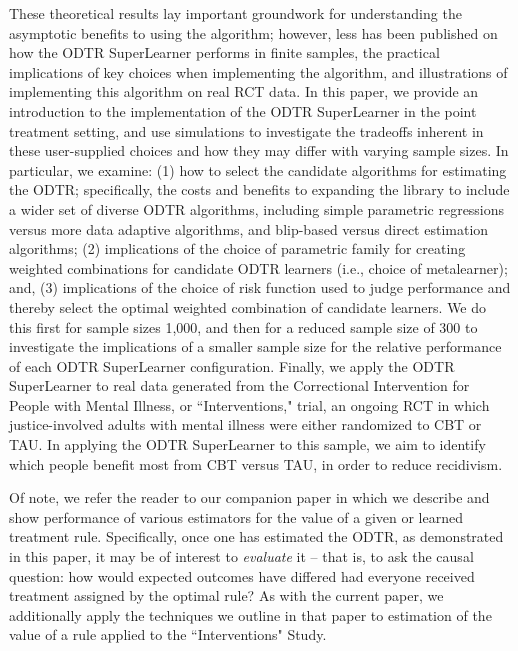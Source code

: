 \documentclass[a4paper,12pt]{article}
\begin{document}
These theoretical results lay important groundwork for understanding the asymptotic benefits to using the algorithm; however, less has been published on how the ODTR SuperLearner performs in finite samples, the practical implications of key choices when implementing the algorithm, and illustrations of implementing this algorithm on real RCT data. In this paper, we provide an introduction to the implementation of the ODTR SuperLearner in the point treatment setting, and use simulations to investigate the tradeoffs inherent in these user-supplied choices and how they may differ with varying sample sizes. In particular, we examine: (1) how to select the candidate algorithms for estimating the ODTR; specifically, the costs and benefits to expanding the library to include a wider set of diverse ODTR algorithms, including simple parametric regressions versus more data adaptive algorithms, and blip-based versus direct estimation algorithms; (2) implications of the choice of parametric family for creating weighted combinations for candidate ODTR learners (i.e., choice of metalearner); and, (3) implications of the choice of risk function used to judge performance and thereby select the optimal weighted combination of candidate learners. We do this first for sample sizes 1,000, and then for a reduced sample size of 300 to investigate the implications of a smaller sample size for the relative performance of each ODTR SuperLearner configuration. Finally, we apply the ODTR SuperLearner to real data generated from the Correctional Intervention for People with Mental Illness, or ``Interventions," trial, an ongoing RCT in which justice-involved adults with mental illness were either randomized to CBT or TAU. In applying the ODTR SuperLearner to this sample, we aim to identify which people benefit most from CBT versus TAU, in order to reduce recidivism.

Of note, we refer the reader to our companion paper \citep{montoyaplaceholder} in which we describe and show performance of various estimators for the value of a given or learned treatment rule. Specifically, once one has estimated the ODTR, as demonstrated in this paper, it may be of interest to \textit{evaluate} it -- that is, to ask the causal question: how would expected outcomes have differed had everyone received treatment assigned by the optimal rule? As with the current paper, we additionally apply the techniques we outline in that paper to estimation of the value of a rule applied to the ``Interventions" Study.
\end{document}
